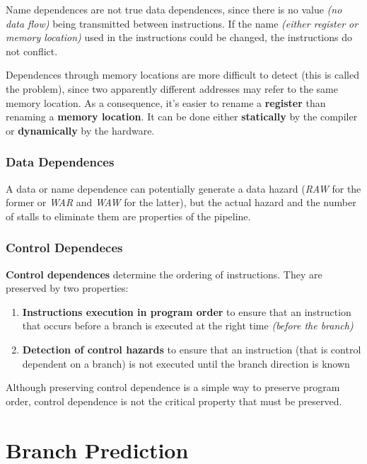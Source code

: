 \documentclass[english]{article}
\begin{document}
Name dependences are not true data dependences, since there is no value \textit{(no data flow)} being transmitted between instructions.
If the name \textit{(either register or memory location)} used in the instructions could be changed, the instructions do not conflict.

Dependences through memory locations are more difficult to detect (this is called the  problem), since two apparently different addresses may refer to the same memory location.
As a consequence, it's easier to rename a \textbf{register} than renaming a \textbf{memory location}.
It can be done either \textbf{statically} by the compiler or \textbf{dynamically} by the hardware.

\subsubsection{Data Dependences}

A data or name dependence can potentially generate a data hazard (\textit{RAW} for the former or \textit{WAR} and \textit{WAW} for the latter), but the actual hazard and the number of stalls to eliminate them are properties of the pipeline.

\subsubsection{Control Dependeces}

\textbf{Control dependences} determine the ordering of instructions.
They are preserved by two properties:

\begin{enumerate}
  \item \textbf{Instructions execution in program order} to ensure that an instruction that occurs before a branch is executed at the right time \textit{(before the branch)}
  \item \textbf{Detection of control hazards} to ensure that an instruction (that is control dependent on a branch) is not executed until the branch direction is known
\end{enumerate}

Although preserving control dependence is a simple way to preserve program order, control dependence is not the critical property that must be preserved.

\newpage

\section{Branch Prediction}
\end{document}
